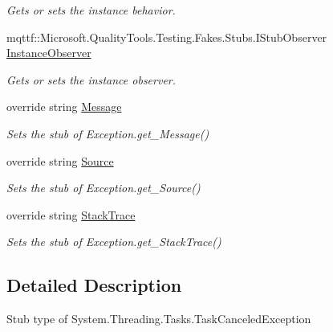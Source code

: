 \begin{DoxyCompactItemize}
\begin{DoxyCompactList}\small\item\em Gets or sets the instance behavior.\end{DoxyCompactList}\item 
mqttf\-::\-Microsoft.\-Quality\-Tools.\-Testing.\-Fakes.\-Stubs.\-I\-Stub\-Observer \hyperlink{class_system_1_1_threading_1_1_tasks_1_1_fakes_1_1_stub_task_canceled_exception_a16875ef346d85b00d914c118475ea1ee}{Instance\-Observer}
\begin{DoxyCompactList}\small\item\em Gets or sets the instance observer.\end{DoxyCompactList}\item 
override string \hyperlink{class_system_1_1_threading_1_1_tasks_1_1_fakes_1_1_stub_task_canceled_exception_ab7be2de63eccb6c0abf937949522afa7}{Message}
\begin{DoxyCompactList}\small\item\em Sets the stub of Exception.\-get\-\_\-\-Message()\end{DoxyCompactList}\item 
override string \hyperlink{class_system_1_1_threading_1_1_tasks_1_1_fakes_1_1_stub_task_canceled_exception_a88b3c9bb75bf336318bd4a8a370e7d7c}{Source}
\begin{DoxyCompactList}\small\item\em Sets the stub of Exception.\-get\-\_\-\-Source()\end{DoxyCompactList}\item 
override string \hyperlink{class_system_1_1_threading_1_1_tasks_1_1_fakes_1_1_stub_task_canceled_exception_a8b1b276d8c05b6a89183aa720e110fc7}{Stack\-Trace}
\begin{DoxyCompactList}\small\item\em Sets the stub of Exception.\-get\-\_\-\-Stack\-Trace()\end{DoxyCompactList}\end{DoxyCompactItemize}


\subsection{Detailed Description}
Stub type of System.\-Threading.\-Tasks.\-Task\-Canceled\-Exception



